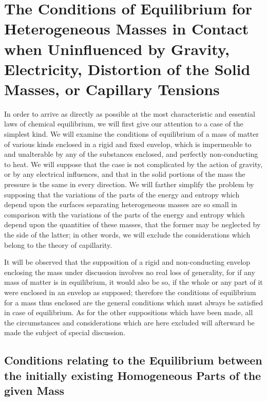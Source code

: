 \documentclass[11pt]{article}
\begin{document}
\section*{The Conditions of Equilibrium for Heterogeneous Masses in Contact when Uninfluenced by Gravity, Electricity, Distortion of the Solid Masses, or Capillary Tensions}

In order to arrive as directly as possible at the most characteristic and essential laws of chemical equilibrium, we will first give our attention to a case of the simplest kind. We will examine the conditions of equilibrium of a mass of matter of various kinds enclosed in a rigid and fixed envelop, which is impermeable to and unalterable by any of the substances enclosed, and perfectly non-conducting to heat. We will suppose that the case is not complicated by the action of gravity, or by any electrical influences, and that in the solid portions of the mass the pressure is the same in every direction. We will farther simplify the problem by supposing that the variations of the parts of the energy and entropy which depend upon the surfaces separating heterogeneous masses are so small in comparison with the variations of the parts of the energy and entropy which depend upon the quantities of these masses, that the former may be neglected by the side of the latter; in other words, we will exclude the considerations which belong to the theory of capillarity.

It will be observed that the supposition of a rigid and non-conducting envelop enclosing the mass under discussion involves no real loss of generality, for if any mass of matter is in equilibrium, it would also be so, if the whole or any part of it were enclosed in an envelop as supposed; therefore the conditions of equilibrium for a mass thus enclosed are the general conditions which must always be satisfied in case of equilibrium. As for the other suppositions which have been made, all the circumstances and considerations which are here excluded will afterward be made the subject of special discussion.

\subsection*{Conditions relating to the Equilibrium between the initially existing Homogeneous Parts of the given Mass}
\end{document}
